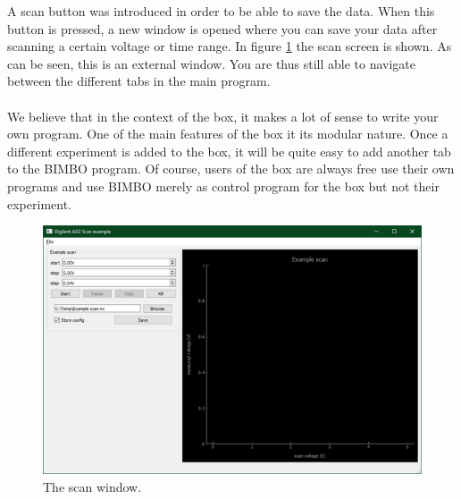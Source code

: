\documentclass[a4paper]{article}
\begin{document}
\indent A scan button was introduced in order to be able to save the data. When this button is pressed, a new window is opened where you can save your data after scanning a certain voltage or time range. In figure \ref{fig5} the scan screen is shown. As can be seen, this is an external window. You are thus still able to navigate between the different tabs in the main program.\\\\
\indent We believe that in the context of the box, it makes a lot of sense to write your own program. One of the main features of the box it its modular nature. Once a different experiment is added to the box, it will be quite easy to add another tab to the BIMBO program. Of course, users of the box are always free use their own programs and use BIMBO merely as control program for the box but not their experiment.
\begin{figure}[h]
	\centering
	\includegraphics[width=0.7 \textwidth]{scanwindow.png}
	\caption{\label{fig5} The scan window.}
\end{figure}
\end{document}
